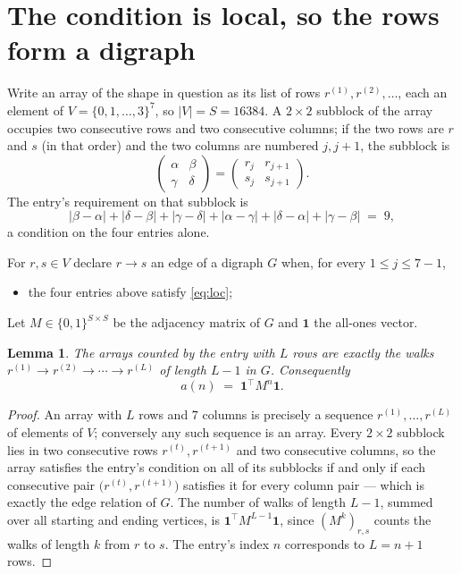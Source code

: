 \documentclass[11pt,a4paper]{article}
\theoremstyle{plain}
\newtheorem{lemma}[theorem]{Lemma}
\theoremstyle{definition}
\begin{document}
\section{The condition is local, so the rows form a digraph}

Write an array of the shape in question as its list of rows
$r^{(1)},r^{(2)},\dots$, each an element of
$V=\{0,1,\dots,3\}^{7}$, so $|V|=S=16384$. A $2\times2$ subblock of the array
occupies two consecutive rows and two consecutive columns; if the two rows are $r$
and $s$ (in that order) and the two columns are numbered $j,j+1$,
the subblock is
\[
\begin{pmatrix}\alpha&\beta\\\gamma&\delta\end{pmatrix}=\begin{pmatrix}r_j&r_{j+1}\\s_j&s_{j+1}\end{pmatrix}.
\]
The entry's requirement on that subblock is
\begin{equation}\label{eq:loc}
|\beta-\alpha|+|\delta-\beta|+|\gamma-\delta|+|\alpha-\gamma|+|\delta-\alpha|+|\gamma-\beta|\;=\;9,
\end{equation}
a condition on the four entries alone.

For $r,s\in V$ declare $r\to s$ an edge of a digraph $G$ when, for every
$1\le j\le 7-1$,
\begin{itemize}
\item the four entries above satisfy \eqref{eq:loc};

\end{itemize}
Let $M\in\{0,1\}^{S\times S}$ be the adjacency matrix of $G$ and $\mathbf{1}$ the
all-ones vector.

\begin{lemma}\label{lem:walk}
The arrays counted by the entry with $L$ rows are exactly the walks
$r^{(1)}\to r^{(2)}\to\cdots\to r^{(L)}$ of length $L-1$ in $G$. Consequently
\[
a(n)\;=\;\mathbf{1}^{\!\top}M^{n}\mathbf{1} .
\]
\end{lemma}

\begin{proof}
An array with $L$ rows and $7$ columns is precisely a sequence
$r^{(1)},\dots,r^{(L)}$ of elements of $V$; conversely any such sequence is an array.
Every $2\times2$ subblock lies in two consecutive rows $r^{(t)},r^{(t+1)}$ and two
consecutive columns, so the array satisfies the entry's condition on all of its subblocks
if and only if each consecutive pair $\bigl(r^{(t)},r^{(t+1)}\bigr)$ satisfies it for
every column pair --- which is exactly the edge relation of $G$. The number of walks of
length $L-1$, summed over all starting and ending vertices, is
$\mathbf{1}^{\!\top}M^{L-1}\mathbf{1}$, since $(M^{k})_{r,s}$ counts the walks of
length $k$ from $r$ to $s$. The entry's index $n$ corresponds to $L=n+1$ rows.
\end{proof}
\end{document}
